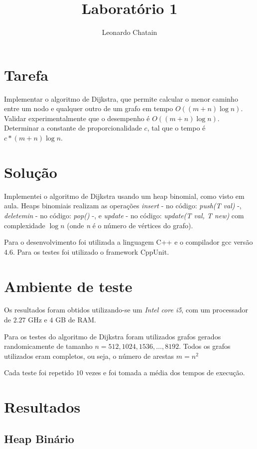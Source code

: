 \documentclass{article}
\title{Laboratório 1}
\author{Leonardo Chatain}
\begin{document}
\maketitle

\section{Tarefa}
Implementar o algoritmo de Dijkstra, que permite calcular o menor caminho entre um nodo e qualquer outro de um grafo em tempo $O((m + n) \log n)$. Validar experimentalmente que o desempenho é $O((m + n) \log n)$. Determinar a constante de proporcionalidade $c$, tal que o tempo é $c*(m + n) \log n$.

\section{Solução}
Implementei o algoritmo de Dijkstra usando um heap binomial, como visto em aula. Heaps binomiais realizam as operações \emph{insert} - no código: \emph{push(T val)} -, \emph{deletemin} - no código: \emph{pop()} -, e \emph{update} - no código: \emph{update(T val, T new)} com complexidade $ \log n $ (onde \emph{n} é o número de vértices do grafo).

Para o desenvolvimento foi utilizada a linguagem C++ e o compilador gcc versão 4.6. Para os testes foi utilizado o framework CppUnit.

\section{Ambiente de teste}

Os resultados foram obtidos utilizando-se um \emph{Intel core i5}, com um processador de $2.27$ GHz e $4$ GB de RAM.

Para os testes do algoritmo de Dijkstra foram utilizados grafos gerados randomicamente de tamanho $n=512,1024,1536,\ldots,8192$. Todos os grafos utilizados eram completos, ou seja, o número de arestas $m=n ^ 2$

Cada teste foi repetido $10$ vezes e foi tomada a média dos tempos de execução.

\section{Resultados}

\subsection{Heap Binário}
\end{document}
